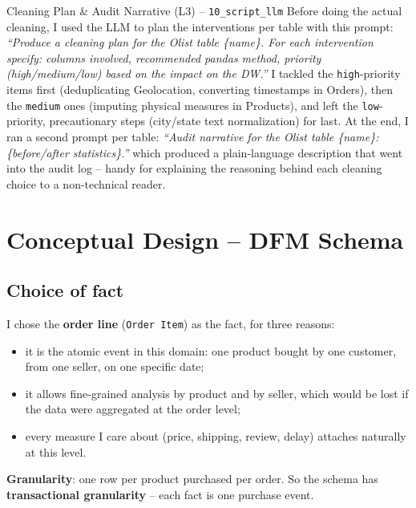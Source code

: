 \documentclass[12pt,a4paper]{article}
\begin{document}
\begin{aibox}{Cleaning Plan \& Audit Narrative (L3) -- \texttt{10\_script\_llm}}
Before doing the actual cleaning, I used the LLM to plan the interventions per
table with this prompt: \textit{``Produce a cleaning plan for the Olist table
\{name\}. For each intervention specify: columns involved, recommended pandas
method, priority (high/medium/low) based on the impact on the DW.''}
I tackled the \texttt{high}-priority items first (deduplicating Geolocation,
converting timestamps in Orders), then the \texttt{medium} ones (imputing physical
measures in Products), and left the \texttt{low}-priority, precautionary steps
(city/state text normalization) for last. At the end, I ran a second prompt per
table: \textit{``Audit narrative for the Olist table \{name\}: \{before/after
statistics\}.''} which produced a plain-language description that went into the
audit log -- handy for explaining the reasoning behind each cleaning choice to a
non-technical reader.
\end{aibox}

\section{Conceptual Design -- DFM Schema}

\subsection{Choice of fact}

I chose the \textbf{order line} (\texttt{Order Item}) as the fact, for three reasons:

\begin{itemize}
  \item it is the atomic event in this domain: one product bought by one customer,
        from one seller, on one specific date;
  \item it allows fine-grained analysis by product and by seller, which would be
        lost if the data were aggregated at the order level;
  \item every measure I care about (price, shipping, review, delay) attaches
        naturally at this level.
\end{itemize}

\textbf{Granularity}: one row per product purchased per order. So the schema has
\textbf{transactional granularity} -- each fact is one purchase event.
\end{document}
